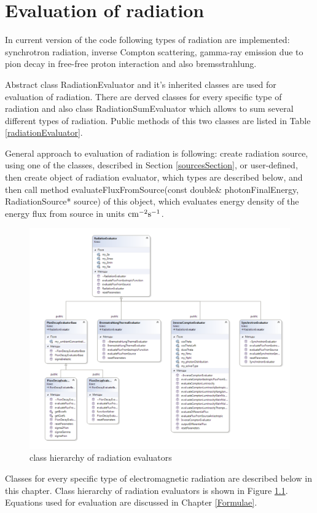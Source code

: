 \chapter{Evaluation of radiation}\label{evaluation}
In current version of the code following types of radiation are implemented: synchrotron radiation, inverse Compton scattering, gamma-ray emission due to pion decay in free-free proton interaction and also bremsstrahlung.

Abstract class RadiationEvaluator and it's inherited classes are used for evaluation of radiation. There are derved classes for every specific type of radiation and also class RadiationSumEvaluator which allows to sum several different types of radiation. Public methods of this two classes are listed in Table \ref{radiationEvaluator}. 

General approach to evaluation of radiation is following: create radiation source, using one of the classes, described in Section \ref{sourcesSection}, or user-defined, then create object of radiation evaluator, which types are described below, and then call method evaluateFluxFromSource(const double\& photonFinalEnergy, RadiationSource* source) of this object, which evaluates energy density of the energy flux from source in units $\rm cm^{-2} s^{-1}$.

\begin{figure}[h]
	\centering
	\includegraphics[width=10.5 cm]{./fig/radiationEvaluator.png} 
	\caption{class hierarchy of radiation evaluators}
	\label{radiationEvaluators}
\end{figure}

Classes for every specific type of electromagnetic radiation are described below in this chapter. Class hierarchy of radiation evaluators is shown in Figure \ref{radiationEvaluators}. Equations used for evaluation are discussed in Chapter \ref{Formulae}.

